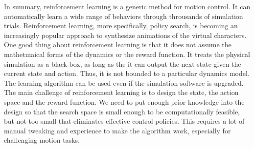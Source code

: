 In summary, reinforcement learning is a generic method for motion control. It can automatically learn a wide range of behaviors through throusands of simulation trials. Reinforcement learning, more specifically, policy search, is becoming an increasingly popular approach to synthesize animations of the virtual characters. One good thing about reinforcement learning is that it does not assume the mathetmaical forms of the dynamics or the reward function. It treats the physical simulation as a black box, as long as the it can output the next state given the current state and action. Thus, it is not bounded to a particular dynamics model. The learning algorithm can be used even if the simulation software is upgraded. The main challenge of reinforcement learning is to design the state, the action space and the reward function. We need to put enough prior knowledge into the design so that the search space is small enough to be computationally feasible, but not too small that eliminates effective control policies. This requires a lot of manual tweaking and experience to make the algorithm work, especially for challenging motion tasks. 
